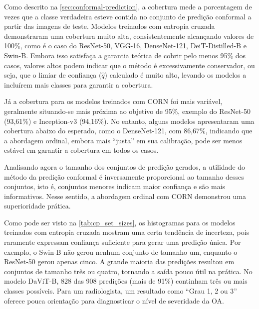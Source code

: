Como descrito na \autoref{sec:conformal-prediction}, a cobertura mede a porcentagem de vezes que a classe verdadeira esteve contida no conjunto de predição conformal a partir das imagens de teste. Modelos treinados com entropia cruzada demonstraram uma cobertura muito alta, consistentemente alcançando valores de 100\%, como é o caso do ResNet-50, VGG-16, DenseNet-121, DeiT-Distilled-B e Swin-B. Embora isso satisfaça a garantia teórica de cobrir pelo menos 95\% dos casos, valores altos podem indicar que o método é excessivamente conservador, ou seja, que o limiar de confiança ($\hat{q}$) calculado é muito alto, levando os modelos a incluírem mais classes para garantir a cobertura.

Já a cobertura para os modelos treinados com CORN foi mais variável, geralmente situando-se mais próxima ao objetivo de 95\%, exemplo do ResNet-50 (93,61\%) e Inception-v3 (94,16\%). No entanto, alguns modelos apresentaram uma cobertura abaixo do esperado, como o DenseNet-121, com 86,67\%, indicando que a abordagem ordinal, embora mais ``justa'' em sua calibração, pode ser menos estável em garantir a cobertura em todos os casos.

Analisando agora o tamanho dos conjuntos de predição gerados, a utilidade do método da predição conformal é inversamente proporcional ao tamanho desses conjuntos, isto é, conjuntos menores indicam maior confiança e são mais informativos. Nesse sentido, a abordagem ordinal com CORN demonstrou uma superioridade prática.

Como pode ser visto na \autoref{tab:cp_set_sizes}, os histogramas para os modelos treinados com entropia cruzada mostram uma certa tendência de incerteza, pois raramente expressam confiança suficiente para gerar uma predição única. Por exemplo, o Swin-B não gerou nenhum conjunto de tamanho um, enquanto o ResNet-50 gerou apenas cinco. A grande maioria das predições resultou em conjuntos de tamanho três ou quatro, tornando a saída pouco útil na prática. No modelo DaViT-B, 828 das 908 predições (mais de 91\%) continham três ou mais classes possíveis. Para um radiologista, um resultado como ``Grau 1, 2 ou 3'' oferece pouca orientação para diagnosticar o nível de severidade da OA.

